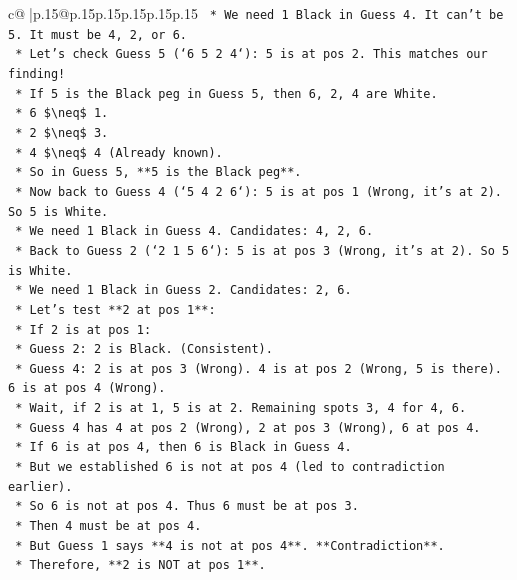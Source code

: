 \documentclass{article}
\begin{document}
{\begin{supertabular}{c@{$\;$}|p{.15\linewidth}@{}p{.15\linewidth}p{.15\linewidth}p{.15\linewidth}p{.15\linewidth}p{.15\linewidth}}
{{{\texttt{    *   We need 1 Black in Guess 4. It can't be 5. It must be 4, 2, or 6.} \\
\texttt{    *   Let's check Guess 5 (`6 5 2 4`): 5 is at pos 2. This matches our finding!} \\
\texttt{    *   If 5 is the Black peg in Guess 5, then 6, 2, 4 are White.} \\
\texttt{        *   6 \$\textbackslash{}neq\$ 1.} \\
\texttt{        *   2 \$\textbackslash{}neq\$ 3.} \\
\texttt{        *   4 \$\textbackslash{}neq\$ 4 (Already known).} \\
\texttt{    *   So in Guess 5, **5 is the Black peg**.} \\
\texttt{    *   Now back to Guess 4 (`5 4 2 6`): 5 is at pos 1 (Wrong, it's at 2). So 5 is White.} \\
\texttt{    *   We need 1 Black in Guess 4. Candidates: 4, 2, 6.} \\
\texttt{    *   Back to Guess 2 (`2 1 5 6`): 5 is at pos 3 (Wrong, it's at 2). So 5 is White.} \\
\texttt{    *   We need 1 Black in Guess 2. Candidates: 2, 6.} \\
\texttt{    *   Let's test **2 at pos 1**:} \\
\texttt{        *   If 2 is at pos 1:} \\
\texttt{            *   Guess 2: 2 is Black. (Consistent).} \\
\texttt{            *   Guess 4: 2 is at pos 3 (Wrong). 4 is at pos 2 (Wrong, 5 is there). 6 is at pos 4 (Wrong).} \\
\texttt{                *   Wait, if 2 is at 1, 5 is at 2. Remaining spots 3, 4 for 4, 6.} \\
\texttt{                *   Guess 4 has 4 at pos 2 (Wrong), 2 at pos 3 (Wrong), 6 at pos 4.} \\
\texttt{                *   If 6 is at pos 4, then 6 is Black in Guess 4.} \\
\texttt{                *   But we established 6 is not at pos 4 (led to contradiction earlier).} \\
\texttt{                *   So 6 is not at pos 4. Thus 6 must be at pos 3.} \\
\texttt{                *   Then 4 must be at pos 4.} \\
\texttt{                *   But Guess 1 says **4 is not at pos 4**. **Contradiction**.} \\
\texttt{    *   Therefore, **2 is NOT at pos 1**.} \\
}}}
\end{supertabular}}
\end{document}
